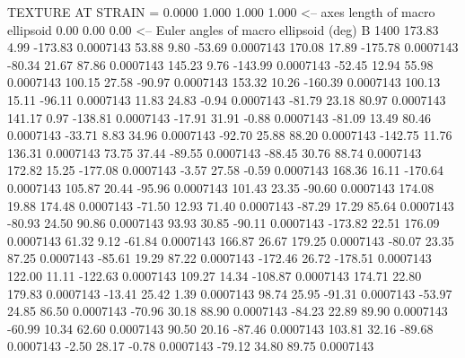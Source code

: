TEXTURE AT STRAIN =    0.0000
   1.000   1.000   1.000  <-- axes length of macro ellipsoid
    0.00    0.00    0.00  <-- Euler angles of macro ellipsoid (deg)
B      1400
      173.83        4.99     -173.83     0.0007143
       53.88        9.80      -53.69     0.0007143
      170.08       17.89     -175.78     0.0007143
      -80.34       21.67       87.86     0.0007143
      145.23        9.76     -143.99     0.0007143
      -52.45       12.94       55.98     0.0007143
      100.15       27.58      -90.97     0.0007143
      153.32       10.26     -160.39     0.0007143
      100.13       15.11      -96.11     0.0007143
       11.83       24.83       -0.94     0.0007143
      -81.79       23.18       80.97     0.0007143
      141.17        0.97     -138.81     0.0007143
      -17.91       31.91       -0.88     0.0007143
      -81.09       13.49       80.46     0.0007143
      -33.71        8.83       34.96     0.0007143
      -92.70       25.88       88.20     0.0007143
     -142.75       11.76      136.31     0.0007143
       73.75       37.44      -89.55     0.0007143
      -88.45       30.76       88.74     0.0007143
      172.82       15.25     -177.08     0.0007143
       -3.57       27.58       -0.59     0.0007143
      168.36       16.11     -170.64     0.0007143
      105.87       20.44      -95.96     0.0007143
      101.43       23.35      -90.60     0.0007143
      174.08       19.88      174.48     0.0007143
      -71.50       12.93       71.40     0.0007143
      -87.29       17.29       85.64     0.0007143
      -80.93       24.50       90.86     0.0007143
       93.93       30.85      -90.11     0.0007143
     -173.82       22.51      176.09     0.0007143
       61.32        9.12      -61.84     0.0007143
      166.87       26.67      179.25     0.0007143
      -80.07       23.35       87.25     0.0007143
      -85.61       19.29       87.22     0.0007143
     -172.46       26.72     -178.51     0.0007143
      122.00       11.11     -122.63     0.0007143
      109.27       14.34     -108.87     0.0007143
      174.71       22.80      179.83     0.0007143
      -13.41       25.42        1.39     0.0007143
       98.74       25.95      -91.31     0.0007143
      -53.97       24.85       86.50     0.0007143
      -70.96       30.18       88.90     0.0007143
      -84.23       22.89       89.90     0.0007143
      -60.99       10.34       62.60     0.0007143
       90.50       20.16      -87.46     0.0007143
      103.81       32.16      -89.68     0.0007143
       -2.50       28.17       -0.78     0.0007143
      -79.12       34.80       89.75     0.0007143
